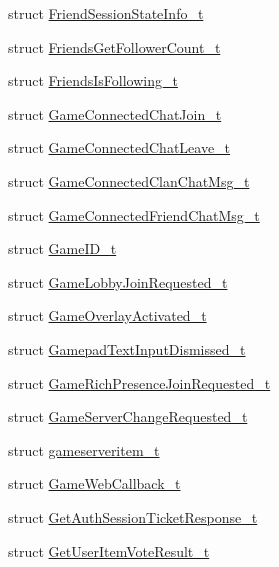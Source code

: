 \begin{DoxyCompactItemize}
struct \hyperlink{structValve_1_1Steamworks_1_1FriendSessionStateInfo__t}{Friend\+Session\+State\+Info\+\_\+t}
\item 
struct \hyperlink{structValve_1_1Steamworks_1_1FriendsGetFollowerCount__t}{Friends\+Get\+Follower\+Count\+\_\+t}
\item 
struct \hyperlink{structValve_1_1Steamworks_1_1FriendsIsFollowing__t}{Friends\+Is\+Following\+\_\+t}
\item 
struct \hyperlink{structValve_1_1Steamworks_1_1GameConnectedChatJoin__t}{Game\+Connected\+Chat\+Join\+\_\+t}
\item 
struct \hyperlink{structValve_1_1Steamworks_1_1GameConnectedChatLeave__t}{Game\+Connected\+Chat\+Leave\+\_\+t}
\item 
struct \hyperlink{structValve_1_1Steamworks_1_1GameConnectedClanChatMsg__t}{Game\+Connected\+Clan\+Chat\+Msg\+\_\+t}
\item 
struct \hyperlink{structValve_1_1Steamworks_1_1GameConnectedFriendChatMsg__t}{Game\+Connected\+Friend\+Chat\+Msg\+\_\+t}
\item 
struct \hyperlink{structValve_1_1Steamworks_1_1GameID__t}{Game\+I\+D\+\_\+t}
\item 
struct \hyperlink{structValve_1_1Steamworks_1_1GameLobbyJoinRequested__t}{Game\+Lobby\+Join\+Requested\+\_\+t}
\item 
struct \hyperlink{structValve_1_1Steamworks_1_1GameOverlayActivated__t}{Game\+Overlay\+Activated\+\_\+t}
\item 
struct \hyperlink{structValve_1_1Steamworks_1_1GamepadTextInputDismissed__t}{Gamepad\+Text\+Input\+Dismissed\+\_\+t}
\item 
struct \hyperlink{structValve_1_1Steamworks_1_1GameRichPresenceJoinRequested__t}{Game\+Rich\+Presence\+Join\+Requested\+\_\+t}
\item 
struct \hyperlink{structValve_1_1Steamworks_1_1GameServerChangeRequested__t}{Game\+Server\+Change\+Requested\+\_\+t}
\item 
struct \hyperlink{structValve_1_1Steamworks_1_1gameserveritem__t}{gameserveritem\+\_\+t}
\item 
struct \hyperlink{structValve_1_1Steamworks_1_1GameWebCallback__t}{Game\+Web\+Callback\+\_\+t}
\item 
struct \hyperlink{structValve_1_1Steamworks_1_1GetAuthSessionTicketResponse__t}{Get\+Auth\+Session\+Ticket\+Response\+\_\+t}
\item 
struct \hyperlink{structValve_1_1Steamworks_1_1GetUserItemVoteResult__t}{Get\+User\+Item\+Vote\+Result\+\_\+t}

\end{DoxyCompactItemize}
